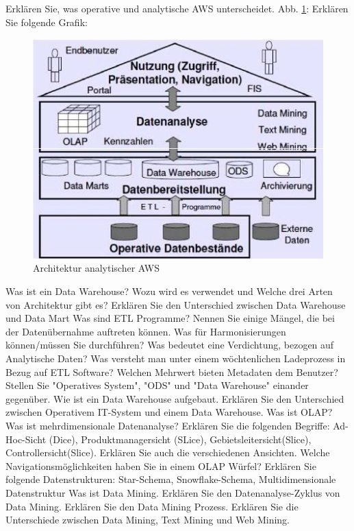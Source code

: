 \documentclass[ngerman,a4paper,12pt]{scrreprt}
\begin{document}
\olR
	\li Erklären Sie, was operative und analytische AWS unterscheidet.
	\li Abb. \ref{archAnaAWA}: Erklären Sie folgende Grafik:
	 	\begin{figure}[htp]
			\centering
			\includegraphics[scale=1]{img/R6.1.jpg}
			\caption{Architektur analytischer AWS}
			\label{archAnaAWA}
		\end{figure}
	\li Was ist ein Data Warehouse? Wozu wird es verwendet und Welche drei Arten von Architektur gibt es?
	\li  Erklären Sie den Unterschied zwischen Data Warehouse und Data Mart
	\li Was sind ETL Programme?
	\li Nennen Sie einige Mängel, die bei der Datenübernahme auftreten können. Was für Harmonisierungen können/müssen Sie durchführen?
	\li Was bedeutet eine Verdichtung, bezogen auf Analytische Daten?
	\li Was versteht man unter einem wöchtenlichen Ladeprozess in Bezug auf ETL Software?
	\li Welchen Mehrwert bieten Metadaten dem Benutzer?
	\li Stellen Sie "Operatives System", "ODS" und "Data Warehouse" einander gegenüber.
	\li Wie ist ein Data Warehouse aufgebaut.
	\li Erklären Sie den Unterschied zwischen Operativem IT-System und einem Data Warehouse.
	\li Was ist OLAP?
	\li Was ist mehrdimensionale Datenanalyse? Erklären Sie die folgenden Begriffe: Ad-Hoc-Sicht (Dice), Produktmanagersicht (SLice), Gebietsleitersicht(Slice), Controllersicht(Slice). Erklären Sie auch die verschiedenen Ansichten.
	\li Welche Navigationsmöglichkeiten haben Sie in einem OLAP Würfel?
	\li Erklären Sie folgende Datenstrukturen: Star-Schema, Snowflake-Schema, Multidimensionale Datenstruktur
	\li Was ist Data Mining.
	\li Erklären Sie den Datenanalyse-Zyklus von Data Mining.
	\li Erklären Sie den Data Mining Prozess.
	\li Erklären Sie die Unterschiede zwischen Data Mining, Text Mining und Web Mining.
\end{document}

